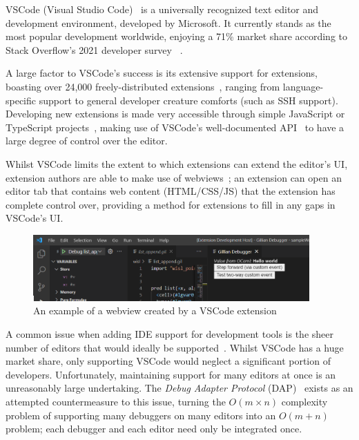VSCode (Visual Studio Code)~\cite{vscode} is a universally recognized text
editor and development environment, developed by Microsoft. It currently stands
as the most popular development worldwide, enjoying a 71\% market share
according to Stack Overflow's 2021 developer survey
~\cite{stack-overflow-survey-editors}.

A large factor to VSCode's success is its extensive support for extensions,
boasting over 24,000 freely-distributed extensions~\cite{vscode-features},
ranging from language-specific support to general developer creature comforts
(such as SSH support). Developing new extensions is made very accessible through
simple JavaScript or TypeScript projects~\cite{vscode-extensions-intro}, making
use of VSCode's well-documented API~\cite{vscode-api} to have a large degree of
control over the editor.

Whilst VSCode limits the extent to which extensions can extend the editor's UI,
extension authors are able to make use of webviews~\cite{vscode-webview}; an
extension can open an editor tab that contains web content (HTML/CSS/JS) that
the extension has complete control over, providing a method for extensions to
fill in any gaps in VSCode's UI.\@

\begin{figure}
  \center{}
  \includegraphics[width=400px]{img/webview-example.png}
  \caption{An example of a webview created by a VSCode extension}%
  \label{fig:webview-example}
\end{figure}


A common issue when adding IDE support for development tools is the sheer
number of editors that would ideally be supported~\cite{magpiebridge}. Whilst
VSCode has a huge market share, only supporting VSCode would neglect a
significant portion of developers. Unfortunately, maintaining support for many
editors at once is an unreasonably large undertaking. The \textit{Debug Adapter
Protocol} (DAP)~\cite{dap} exists as an attempted countermeasure to this issue,
turning the $O(m \times n)$ complexity problem of supporting many debuggers on
many editors into an $O(m + n)$ problem; each debugger and each editor need only
be integrated once.

